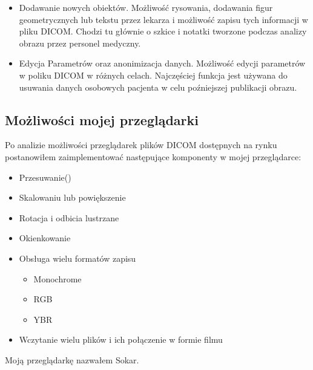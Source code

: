 \begin{itemize}
      \item Dodawanie nowych obiektów.
            Możliwość rysowania, dodawania figur geometrycznych lub tekstu przez lekarza i możliwość zapisu tych informacji w pliku DICOM.
            Chodzi tu głównie o szkice i notatki tworzone podczas analizy obrazu przez personel medyczny.

      \item Edycja Parametrów oraz anonimizacja danych.
            Możliwość edycji parametrów w poliku DICOM w różnych celach.
            Najczęściej funkcja jest używana do usuwania danych osobowych pacjenta w celu poźniejszej publikacji obrazu.

\end{itemize}

\subsection{Możliwości mojej przeglądarki}

Po analizie możliwości przeglądarek plików DICOM dostępnych na rynku postanowiłem zaimplementować następujące komponenty w mojej przeglądarce:

\begin{itemize}
      \item Przesuwanie()

      \item Skalowaniu lub powiększenie

      \item Rotacja i odbicia lustrzane

      \item Okienkowanie

      \item Obsługa wielu formatów zapisu

            \begin{itemize}
                  \item Monochrome
                  \item RGB
                  \item YBR
            \end{itemize}

      \item Wczytanie wielu plików i ich połączenie w formie filmu
\end{itemize}

Moją przeglądarkę nazwałem Sokar.
